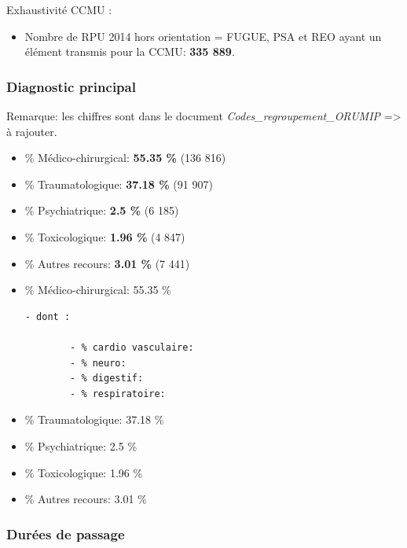 \documentclass[]{article}
\begin{document}
Exhaustivité CCMU :

\begin{itemize}
\itemsep1pt\parskip0pt
\item
  Nombre de RPU 2014 hors orientation = FUGUE, PSA et REO ayant un
  élément transmis pour la CCMU: \textbf{335 889}.
\end{itemize}

\subsubsection{Diagnostic principal}\label{diagnostic-principal}

Remarque: les chiffres sont dans le document
\emph{Codes\_regroupement\_ORUMIP} =\textgreater{} à rajouter.

\begin{itemize}
\item
  \% Médico-chirurgical: \textbf{55.35 \%} (136 816)
\item
  \% Traumatologique: \textbf{37.18 \%} (91 907)
\item
  \% Psychiatrique: \textbf{2.5 \%} (6 185)
\item
  \% Toxicologique: \textbf{1.96 \%} (4 847)
\item
  \% Autres recours: \textbf{3.01 \%} (7 441)
\item
  \% Médico-chirurgical: 55.35 \%

\begin{verbatim}
- dont :

        - % cardio vasculaire:
        - % neuro:
        - % digestif:
        - % respiratoire:
\end{verbatim}
\item
  \% Traumatologique: 37.18 \%
\item
  \% Psychiatrique: 2.5 \%
\item
  \% Toxicologique: 1.96 \%
\item
  \% Autres recours: 3.01 \%
\end{itemize}

\subsubsection{Durées de passage}\label{durees-de-passage}
\end{document}
